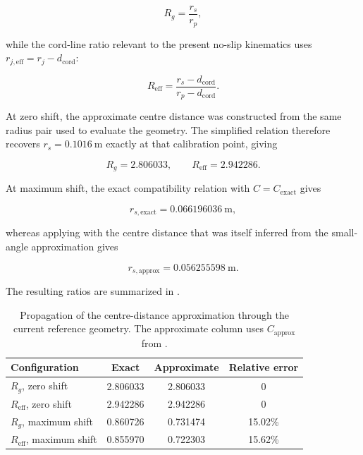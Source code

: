 \documentclass[11pt]{report}
\begin{document}
\begin{equation}
R_g=\frac{r_s}{r_p},
\label{eq:outer-geometric-ratio}
\end{equation}

while the cord-line ratio relevant to the present no-slip kinematics uses
\(r_{j,\mathrm{eff}}=r_j-d_{\mathrm{cord}}\):

\begin{equation}
R_{\mathrm{eff}}
=
\frac{r_s-d_{\mathrm{cord}}}
{r_p-d_{\mathrm{cord}}}.
\label{eq:effective-geometric-ratio}
\end{equation}

At zero shift, the approximate centre distance was constructed from the same
radius pair used to evaluate the geometry. The simplified relation therefore
recovers \(r_s=\SI{0.1016}{\metre}\) exactly at that calibration point,
giving

\[
R_g=2.806033,
\qquad
R_{\mathrm{eff}}=2.942286.
\]

At maximum shift, the exact compatibility relation with
\(C=C_{\mathrm{exact}}\) gives

\[
r_{s,\mathrm{exact}}
=
\SI{0.066196036}{\metre},
\]

whereas applying  with the centre
distance that was itself inferred from the small-angle approximation gives

\[
r_{s,\mathrm{approx}}
=
\SI{0.056255598}{\metre}.
\]

The resulting ratios are summarized in
.

\begin{table}[H]
\centering
\small
\renewcommand{\arraystretch}{1.12}
\begin{tabular}{@{}lccc@{}}
\toprule
Configuration & Exact & Approximate & Relative error \\
\midrule
\(R_g\), zero shift
& 2.806033 & 2.806033 & 0 \\
\(R_{\mathrm{eff}}\), zero shift
& 2.942286 & 2.942286 & 0 \\
\(R_g\), maximum shift
& 0.860726 & 0.731474 & 15.02\% \\
\(R_{\mathrm{eff}}\), maximum shift
& 0.855970 & 0.722303 & 15.62\% \\
\bottomrule
\end{tabular}
\caption{Propagation of the centre-distance approximation through the current
reference geometry. The approximate column uses
\(C_{\mathrm{approx}}\) from .}
\label{tab:approximation-ratio-errors}
\end{table}
\end{document}

